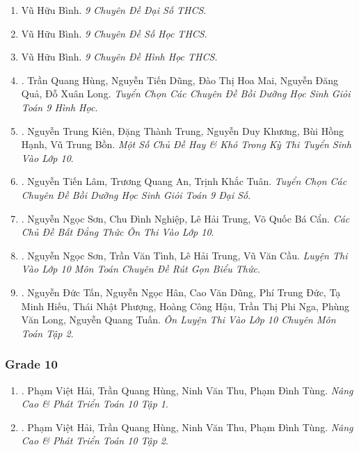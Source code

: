 \documentclass{article}
\begin{document}
\begin{enumerate}
	\item Vũ Hữu Bình. \textit{9 Chuyên Đề Đại Số THCS}.
	\item Vũ Hữu Bình. \textit{9 Chuyên Đề Số Học THCS}.
	\item Vũ Hữu Bình. \textit{9 Chuyên Đề Hình Học THCS}.
	\item \cite{Hung_Dung_Mai_Qua_Long_Toan_9_hinh_hoc}. Trần Quang Hùng, Nguyễn Tiến Dũng, Đào Thị Hoa Mai, Nguyễn Đăng Quả, Đỗ Xuân Long. \textit{Tuyển Chọn Các Chuyên Đề Bồi Dưỡng Học Sinh Giỏi Toán 9 Hình Học}.\hfill{}
	\item \cite{Kien_Trung_Khuong_Hanh_Bon}. Nguyễn Trung Kiên, Đặng Thành Trung, Nguyễn Duy Khương, Bùi Hồng Hạnh, Vũ Trung Bồn. \textit{Một Số Chủ Đề Hay \& Khó Trong Kỳ Thi Tuyển Sinh Vào Lớp 10}.\hfill{}
	\item \cite{Lam_An_Tuan_Toan_9_dai_so}. Nguyễn Tiến Lâm, Trương Quang An, Trịnh Khắc Tuân. \textit{Tuyển Chọn Các Chuyên Đề Bồi Dưỡng Học Sinh Giỏi Toán 9 Đại Số}.\hfill{}
	\item \cite{Son_Nghiep_Trung_Can_bdt}. Nguyễn Ngọc Sơn, Chu Đình Nghiệp, Lê Hải Trung, Võ Quốc Bá Cẩn. \textit{Các Chủ Đề Bất Đẳng Thức Ôn Thi Vào Lớp 10}.\hfill{\sf[bought]}
	\item \cite{Son_Tinh_Trung_Cau_rgbt}. Nguyễn Ngọc Sơn, Trần Văn Tình, Lê Hải Trung, Vũ Văn Cầu. \textit{Luyện Thi Vào Lớp 10 Môn Toán Chuyên Đề Rút Gọn Biểu Thức}.\hfill{}
	\item \cite{Tan_Han_Dung_Duc_Hieu_Phuong_Hau_Nga_Long_Tuan_tap_2}. Nguyễn Đức Tấn, Nguyễn Ngọc Hân, Cao Văn Dũng, Phí Trung Đức, Tạ Minh Hiếu, Thái Nhật Phượng, Hoàng Công Hậu, Trần Thị Phi Nga, Phùng Văn Long, Nguyễn Quang Tuấn. \textit{Ôn Luyện Thi Vào Lớp 10 Chuyên Môn Toán Tập 2}.\hfill{}
\end{enumerate}

\subsubsection{Grade 10}

\begin{enumerate}
	\item \cite{Hai_Hung_Thu_Tung2022_tap_1}. Phạm Việt Hải, Trần Quang Hùng, Ninh Văn Thu, Phạm Đình Tùng. \textit{Nâng Cao \& Phát Triển Toán 10 Tập 1}.\\\mbox{}\hfill{\sf[bought]}
	\item \cite{Hai_Hung_Thu_Tung2022_tap_2}. Phạm Việt Hải, Trần Quang Hùng, Ninh Văn Thu, Phạm Đình Tùng. \textit{Nâng Cao \& Phát Triển Toán 10 Tập 2}.\\\mbox{}\hfill{\sf[bought]}
\end{enumerate}
\end{document}
